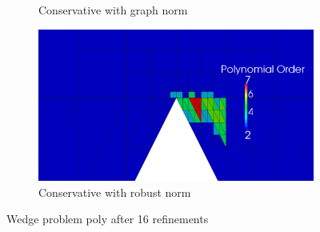\documentclass[letterpaper]{article}
\begin{document}
\begin{figure}
\begin{subfigure}[t]{0.45\textwidth}
\caption{Conservative with graph norm}
\label{fig:wedgeGraph16c_poly}
\end{subfigure}
\begin{subfigure}[t]{0.45\textwidth}
\centering
\includegraphics[width=\textwidth]{figs/Wedge/robust16c_poly.png}
\caption{Conservative with robust norm}
\label{fig:wedgeRobust16c_poly}
\end{subfigure}
\caption{Wedge problem poly after 16 refinements}
\label{fig:wedge_poly}
\end{figure}
\end{document}

